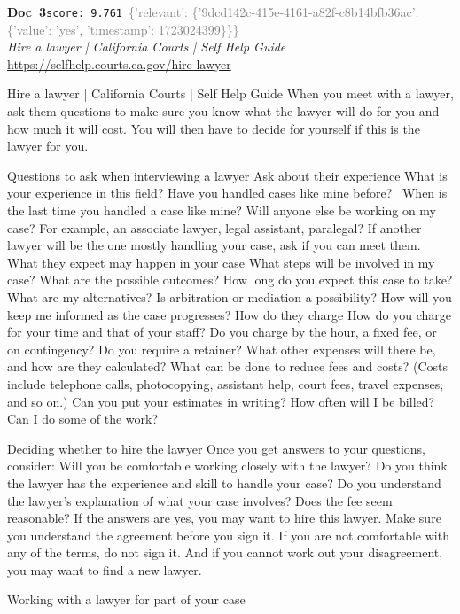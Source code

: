 \documentclass[a4paper,11pt]{article}
\begin{document}
\begin{docenv}
{\footnotesize\textcolor{doccolor}{\textbf{Doc~3}}}\hfill{\tiny\texttt{score:~9.761}}\ {\tiny\textcolor{gray}{\{'relevant': \{'9dcd142c-415e-4161-a82f-c8b14bfb36ac': \{'value': 'yes', 'timestamp': 1723024399\}\}\}}}\\[3pt]
{\small\textit{Hire a lawyer | California Courts | Self Help Guide}}\\[2pt]
{\tiny\url{https://selfhelp.courts.ca.gov/hire-lawyer}}\\[4pt]
{\footnotesize Hire a lawyer | California Courts | Self Help Guide
When you meet with a lawyer, ask them questions to make sure you know what the lawyer will do for you and how much it will cost. You will then have to decide for yourself if this is the lawyer for you.

Questions to ask when interviewing a lawyer
Ask about their experience
What is your experience in this field? 
Have you handled cases like mine before? 
When is the last time you handled a case like mine?
Will anyone else be working on my case? For example, an associate lawyer, legal assistant, paralegal? 
If another lawyer will be the one mostly handling your case, ask if you can meet them.
What they expect may happen in your case
What steps will be involved in my case? 
What are the possible outcomes?
How long do you expect this case to take?
What are my alternatives? Is arbitration or mediation a possibility?
How will you keep me informed as the case progresses?
How do they charge
How do you charge for your time and that of your staff? 
Do you charge by the hour, a fixed fee, or on contingency? 
Do you require a retainer?
What other expenses will there be, and how are they calculated?
What can be done to reduce fees and costs? (Costs include telephone calls, photocopying, assistant help, court fees, travel expenses, and so on.)
Can you put your estimates in writing?
How often will I be billed?
Can I do some of the work?

Deciding whether to hire the lawyer
Once you get answers to your questions, consider:
Will you be comfortable working closely with the lawyer?
Do you think the lawyer has the experience and skill to handle your case?
Do you understand the lawyer's explanation of what your case involves?
Does the fee seem reasonable?
If the answers are yes, you may want to hire this lawyer. Make sure you understand the agreement before you sign it. If you are not comfortable with any of the terms, do not sign it. And if you cannot work out your disagreement, you may want to find a new lawyer.

 Working with a lawyer for part of your case}
\end{docenv}
\end{document}
